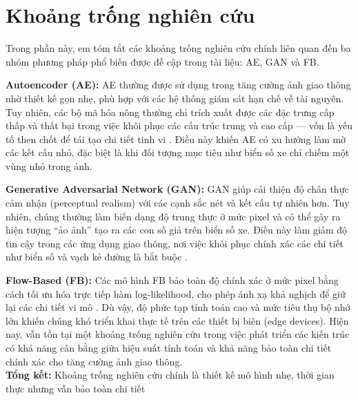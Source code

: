 \section{Khoảng trống nghiên cứu}

Trong phần này, em tóm tắt các khoảng trống nghiên cứu chính liên quan đến ba nhóm phương pháp phổ biến được đề cập trong tài liệu: AE, GAN và FB.

\textbf{Autoencoder (AE):} AE thường được sử dụng trong tăng cường ảnh giao thông nhờ thiết kế gọn nhẹ, phù hợp với các hệ thống giám sát hạn chế về tài nguyên. Tuy nhiên, các bộ mã hóa nông thường chỉ trích xuất được các đặc trưng cấp thấp và thất bại trong việc khôi phục các cấu trúc trung và cao cấp — vốn là yếu tố then chốt để tái tạo chi tiết tinh vi \citep{vincent2008, zhang2017}. Điều này khiến AE có xu hướng làm mờ các kết cấu nhỏ, đặc biệt là khi đối tượng mục tiêu như biển số xe chỉ chiếm một vùng nhỏ trong ảnh.

\textbf{Generative Adversarial Network (GAN):} GAN giúp cải thiện độ chân thực cảm nhận (perceptual realism) với các cạnh sắc nét và kết cấu tự nhiên hơn. Tuy nhiên, chúng thường làm biến dạng độ trung thực ở mức pixel và có thể gây ra hiện tượng ``ảo ảnh'' tạo ra các con số giả trên biển số xe. Điều này làm giảm độ tin cậy trong các ứng dụng giao thông, nơi việc khôi phục chính xác các chi tiết như biển số và vạch kẻ đường là bắt buộc \citep{kupyn2018}.

\textbf{Flow-Based (FB):} Các mô hình FB bảo toàn độ chính xác ở mức pixel bằng cách tối ưu hóa trực tiếp hàm log-likelihood, cho phép ánh xạ khả nghịch để giữ lại các chi tiết vi mô \citep{dinh2017, kingma2018}. Dù vậy, độ phức tạp tính toán cao và mức tiêu thụ bộ nhớ lớn khiến chúng khó triển khai thực tế trên các thiết bị biên (edge devices). Hiện nay, vẫn tồn tại một khoảng trống nghiên cứu trong việc phát triển các kiến trúc có khả năng cân bằng giữa hiệu suất tính toán và khả năng bảo toàn chi tiết chính xác cho tăng cường ảnh giao thông.\\
\textbf{Tổng kết:} Khoảng trống nghiên cứu chính là thiết kế mô hình nhẹ, thời gian thực nhưng vẫn bảo toàn chi tiết


